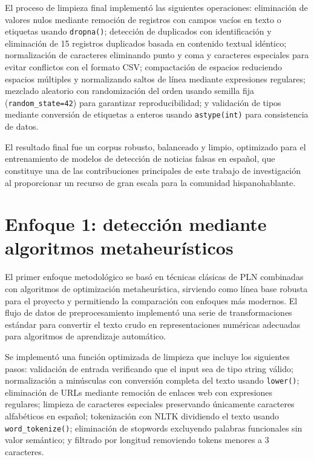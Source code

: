 El proceso de limpieza final implementó las siguientes operaciones: eliminación de valores nulos mediante remoción de registros con campos vacíos en texto o etiquetas usando \texttt{dropna()}; detección de duplicados con identificación y eliminación de 15 registros duplicados basada en contenido textual idéntico; normalización de caracteres eliminando punto y coma y caracteres especiales para evitar conflictos con el formato CSV; compactación de espacios reduciendo espacios múltiples y normalizando saltos de línea mediante expresiones regulares; mezclado aleatorio con randomización del orden usando semilla fija (\texttt{random\_state=42}) para garantizar reproducibilidad; y validación de tipos mediante conversión de etiquetas a enteros usando \texttt{astype(int)} para consistencia de datos.

El resultado final fue un corpus robusto, balanceado y limpio, optimizado para el entrenamiento de modelos de detección de noticias falsas en español, que constituye una de las contribuciones principales de este trabajo de investigación al proporcionar un recurso de gran escala para la comunidad hispanohablante.

\section{Enfoque 1: detección mediante algoritmos metaheurísticos}
\label{sec:enfoque_metaheuristico}

El primer enfoque metodológico se basó en técnicas clásicas de PLN combinadas con algoritmos de optimización metaheurística, sirviendo como línea base robusta para el proyecto y permitiendo la comparación con enfoques más modernos. El flujo de datos de preprocesamiento implementó una serie de transformaciones estándar para convertir el texto crudo en representaciones numéricas adecuadas para algoritmos de aprendizaje automático.

Se implementó una función optimizada de limpieza que incluye los siguientes pasos: validación de entrada verificando que el input sea de tipo string válido; normalización a minúsculas con conversión completa del texto usando \texttt{lower()}; eliminación de URLs mediante remoción de enlaces web con expresiones regulares; limpieza de caracteres especiales preservando únicamente caracteres alfabéticos en español; tokenización con NLTK dividiendo el texto usando \texttt{word\_tokenize()}; eliminación de stopwords excluyendo palabras funcionales sin valor semántico; y filtrado por longitud removiendo tokens menores a 3 caracteres.

